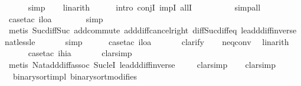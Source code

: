 \begin{isabellebody}
\ \ \ \ \isamarkupfalse%
\ simp\isanewline
\ \ \isamarkupfalse%
\ linarith\isanewline
\ \ \ \ \isamarkupfalse%
\ {\isacharparenleft}intro\ conjI\ impI\ allI{\isacharparenright}\isanewline
\ \ \ \ \ \ \ \ \isamarkupfalse%
\ simp{\isacharunderscore}all\isanewline
\ \ \ \ \ \isamarkupfalse%
\ {\isacharparenleft}case{\isacharunderscore}tac\ {\isachardoublequoteopen}i{\isacharequal}loa{\isachardoublequoteclose}{\isacharparenright}\isanewline
\ \ \ \ \ \ \isamarkupfalse%
\ simp\isanewline
\ \ \ \ \ \ \isamarkupfalse%
\ {\isacharparenleft}metis\ Suc{\isacharunderscore}diff{\isacharunderscore}Suc\ add{\isachardot}commute\ add{\isacharunderscore}diff{\isacharunderscore}cancel{\isacharunderscore}right{\isacharprime}\ diff{\isacharunderscore}Suc{\isacharunderscore}diff{\isacharunderscore}eq{}\ le{\isacharunderscore}add{\isacharunderscore}diff{\isacharunderscore}inverse\ nat{\isacharunderscore}less{\isacharunderscore}le{\isacharparenright}\isanewline
\ \ \ \ \ \isamarkupfalse%
\ simp\isanewline
\ \ \ \ \isamarkupfalse%
\ {\isacharparenleft}case{\isacharunderscore}tac\ {\isachardoublequoteopen}i{\isacharequal}loa{\isachardoublequoteclose}{\isacharparenright}\isanewline
\ \ \ \ \ \isamarkupfalse%
\ clarify\isanewline
\ \ \isamarkupfalse%
\ neq{}{\isacharunderscore}conv\ \isamarkupfalse%
\ linarith\isanewline
\ \ \ \ \isamarkupfalse%
\ {\isacharparenleft}case{\isacharunderscore}tac\ {\isachardoublequoteopen}i{\isacharequal}hia{\isachardoublequoteclose}{\isacharparenright}\isanewline
\ \ \ \ \ \isamarkupfalse%
\ clarsimp\isanewline
\ \ \ \ \ \isamarkupfalse%
\ {\isacharparenleft}metis\ Nat{\isachardot}add{\isacharunderscore}diff{\isacharunderscore}assoc\ Suc{\isacharunderscore}leI\ le{\isacharunderscore}add{\isacharunderscore}diff{\isacharunderscore}inverse{\isacharparenright}\isanewline
\ \ \ \isamarkupfalse%
\ clarsimp\isanewline
\ \ \isamarkupfalse%
\ clarsimp\isanewline
\ \ \isamarkupfalse%
%
\endisatagproof
{\isafoldproof}%
%
\isadelimproof
\isanewline
%
\endisadelimproof
\isanewline
\isanewline
{}\isamarkupfalse%
\ {\isacharparenleft}\ binary{\isacharunderscore}sort{\isacharunderscore}impl{\isacharparenright}\ binary{\isacharunderscore}sort{\isacharunderscore}modifies{\isacharcolon}\isanewline

\end{isabellebody}
